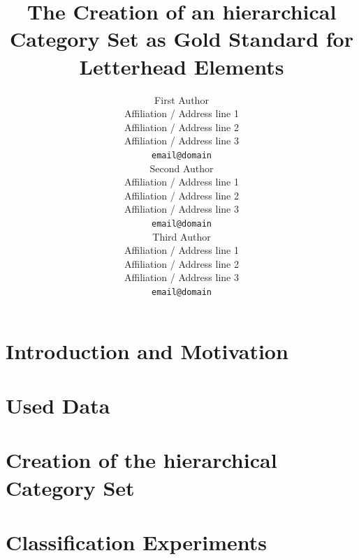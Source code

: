 \documentclass[11pt,a4paper]{article}
\title{The Creation of an hierarchical Category Set as Gold Standard for Letterhead Elements}
\author{First Author \\
  Affiliation / Address line 1 \\
  Affiliation / Address line 2 \\
  Affiliation / Address line 3 \\
  {\tt email@domain} \\\And
  Second Author \\
  Affiliation / Address line 1 \\
  Affiliation / Address line 2 \\
  Affiliation / Address line 3 \\
  {\tt email@domain} \\\And
  Third Author \\
  Affiliation / Address line 1 \\
  Affiliation / Address line 2 \\
  Affiliation / Address line 3 \\
  {\tt email@domain} \\}
\date{}
\begin{document}
\maketitle

\begin{abstract}
 
\end{abstract}

\section{Introduction and Motivation}
 \label{sec:Introduction and Motivation}
 


\section{Used Data}
 \label{sec:Used Data}
 


\section{Creation of the hierarchical Category Set}
 \label{sec:Creation of the hierarchical Category Set}
  



\section{Classification Experiments}
 \label{sec:Classification Experiments}
 

\end{document}
